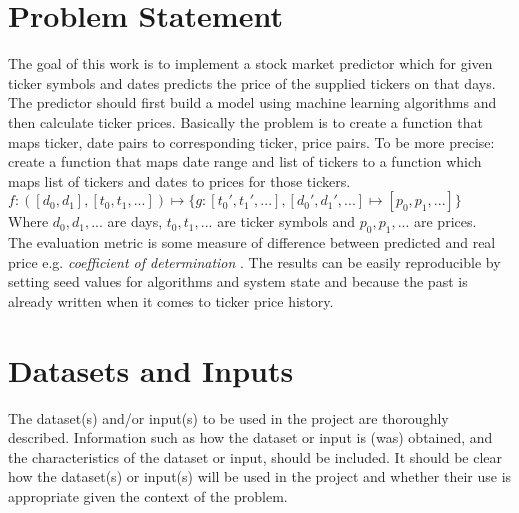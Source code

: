 \section*{Problem Statement}

The goal of this work is to implement a stock market predictor which for given ticker symbols and dates predicts the price of the supplied tickers on that days. The predictor should first build a model using machine learning algorithms and then calculate ticker prices. Basically the problem is to create a function that maps ticker, date pairs to corresponding ticker, price pairs. To be more precise: create a function that maps date range and list of tickers to a function which maps list of tickers and dates to prices for those tickers.\\

$f: ([d_0, d_1], [t_0, t_1, ...]) \mapsto \{ g: [t_0', t_1', ...], [d_0', d_1', ...] \mapsto [p_0, p_1, ...] \}$\\

Where $d_0, d_1, ...$ are days, $t_0, t_1, ...$ are ticker symbols and $p_0, p_1, ...$ are prices.\\

The evaluation metric is some measure of difference between predicted and real price e.g. \emph{coefficient of determination} . The results can be easily reproducible by setting seed values for algorithms and system state and because the past is already written when it comes to ticker price history.

\section*{Datasets and Inputs}

The dataset(s) and/or input(s) to be used in the project are thoroughly described. Information such as how the dataset or input is (was) obtained, and the characteristics of the dataset or input, should be included. It should be clear how the dataset(s) or input(s) will be used in the project and whether their use is appropriate given the context of the problem.


